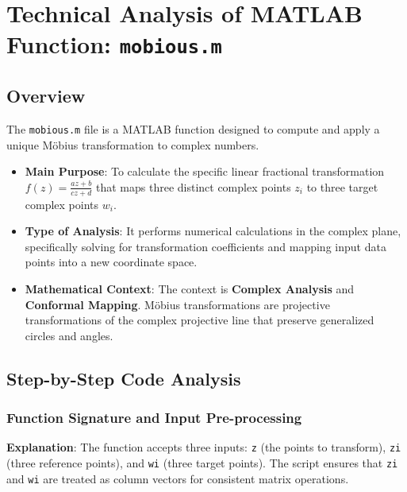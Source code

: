 
\chapter{Technical Analysis of MATLAB Function: \texttt{mobious.m}}
\author{}
\date{}



\maketitle

\section{Overview}

The \texttt{mobious.m} file is a MATLAB function designed to compute and apply a unique M\"{o}bius transformation to complex numbers.

\begin{itemize}
    \item \textbf{Main Purpose}: To calculate the specific linear fractional transformation $f(z) = \frac{az+b}{cz+d}$ that maps three distinct complex points $z_i$ to three target complex points $w_i$.
    \item \textbf{Type of Analysis}: It performs numerical calculations in the complex plane, specifically solving for transformation coefficients and mapping input data points into a new coordinate space.
    \item \textbf{Mathematical Context}: The context is \textbf{Complex Analysis} and \textbf{Conformal Mapping}. M\"{o}bius transformations are projective transformations of the complex projective line that preserve generalized circles and angles.
\end{itemize}

\section{Step-by-Step Code Analysis}

\subsection{Function Signature and Input Pre-processing}
\textbf{Explanation}: The function accepts three inputs: \texttt{z} (the points to transform), \texttt{zi} (three reference points), and \texttt{wi} (three target points). The script ensures that \texttt{zi} and \texttt{wi} are treated as column vectors for consistent matrix operations.

